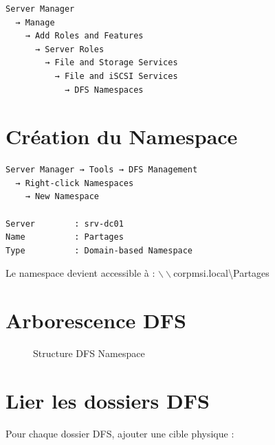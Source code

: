 \begin{lstlisting}
Server Manager
  → Manage
    → Add Roles and Features
      → Server Roles
        → File and Storage Services
          → File and iSCSI Services
            → DFS Namespaces
\end{lstlisting}

\section{Création du Namespace}

\begin{lstlisting}
Server Manager → Tools → DFS Management
  → Right-click Namespaces
    → New Namespace

Server        : srv-dc01
Name          : Partages
Type          : Domain-based Namespace
\end{lstlisting}

Le namespace devient accessible à : $\backslash\backslash$corpmsi.local\textbackslash Partages

\section{Arborescence DFS}

\begin{figure}[H]
    \centering
    \caption{Structure DFS Namespace}
    \label{fig:dfs-structure}
\end{figure}

\section{Lier les dossiers DFS}

Pour chaque dossier DFS, ajouter une cible physique :


